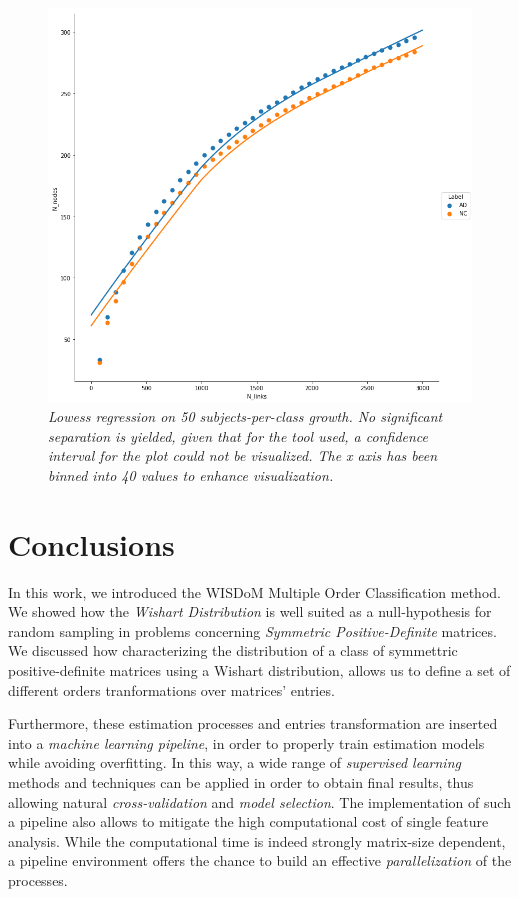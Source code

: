 \documentclass[12pt,openright,twoside,a4paper]{book}
\begin{document}
\begin{figure}[!h]
\centering
\includegraphics[scale=0.4]{ADNI-lowess}
\caption{\textit{Lowess regression on 50 subjects-per-class growth. No significant separation is yielded, given that for the tool used, a confidence interval for the plot could not be visualized. The x axis has been binned into 40 values to enhance visualization.}}
\label{ADNI-lowess}
\end{figure}

\backmatter

\chapter{Conclusions}

In this work, we introduced the WISDoM Multiple Order Classification method.
We showed how the \textit{Wishart Distribution} is well suited as a null-hypothesis for random sampling in problems concerning \textit{Symmetric Positive-Definite} matrices.
We discussed how characterizing the distribution of a class of symmettric positive-definite matrices using a Wishart distribution, allows us to define a set of different orders tranformations over matrices' entries.

Furthermore, these estimation processes and entries transformation are inserted into a \textit{machine learning pipeline}, in order to properly train estimation models while avoiding overfitting.
In this way, a wide range of \textit{supervised learning} methods and techniques can be applied in order to obtain final results, thus allowing natural \textit{cross-validation} and \textit{model selection}.
The implementation of such a pipeline also allows to mitigate the high computational cost of single feature analysis.
While the computational time is indeed strongly matrix-size dependent, a pipeline environment offers the chance to build an effective \textit{parallelization} of the processes.
\end{document}
